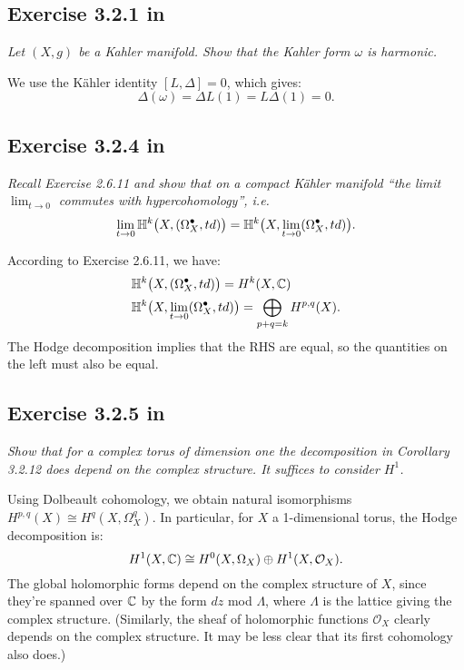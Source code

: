 \documentclass{article}
\begin{document}
\subsection*{Exercise 3.2.1 in \cite{Huy}}
\emph{Let $(X, g)$ be a Kahler manifold. Show that the Kahler form $\omega$ is harmonic.}
\vspace{3mm}

We use the K\"{a}hler identity $[L,\Delta] = 0$, which gives:
\[	\Delta(\omega) = \Delta L(1) = L \Delta (1) = 0.	\]


\subsection*{Exercise 3.2.4 in \cite{Huy}}
\emph{Recall Exercise 2.6.11 and show that on a compact K\"{a}hler manifold ``the
limit $\lim_{t\to 0}$ commutes with hypercohomology'', i.e.}
\[	\lim_{t\to 0} \mathbb{H}^k\big(X, (\Omega_X^{\bullet}, td)\big) = \mathbb{H}^k\big(X, \lim_{t\to 0}(\Omega_X^{\bullet}, td)\big).	\]
\vspace{3mm}

According to Exercise 2.6.11, we have:
\begin{align*}
&\mathbb{H}^k\big(X, (\Omega_X^{\bullet}, td)\big) = H^k(X,\mathbb{C}) \\
&\mathbb{H}^k\big(X, \lim_{t\to 0}(\Omega_X^{\bullet}, td)\big) = \bigoplus_{p+q = k} H^{p,q}(X).
\end{align*}
The Hodge decomposition implies that the RHS are equal, so the quantities on the left must also be equal.


\subsection*{Exercise 3.2.5 in \cite{Huy}}
\emph{Show that for a complex torus of dimension one the decomposition in
Corollary 3.2.12 does depend on the complex structure. It suffices to consider $H^1$.}
\vspace{3mm}

Using Dolbeault cohomology, we obtain natural isomorphisms $H^{p,q}(X) \cong H^q(X,\Omega_X^q)$. 
In particular, for $X$ a 1-dimensional torus, the Hodge decomposition is:
\[	H^1(X,\mathbb{C}) \cong H^0(X,\Omega_X) \oplus H^1(X,\mathcal{O}_X).	\]
The global holomorphic forms depend on the complex structure of $X$, since they're spanned over $\mathbb{C}$ by the form
$dz$ mod $\Lambda$, where $\Lambda$ is the lattice giving the complex structure. (Similarly, the sheaf of holomorphic
functions $\mathcal{O}_X$ clearly depends on the complex structure. It may be less clear that its first cohomology
also does.)
\end{document}
